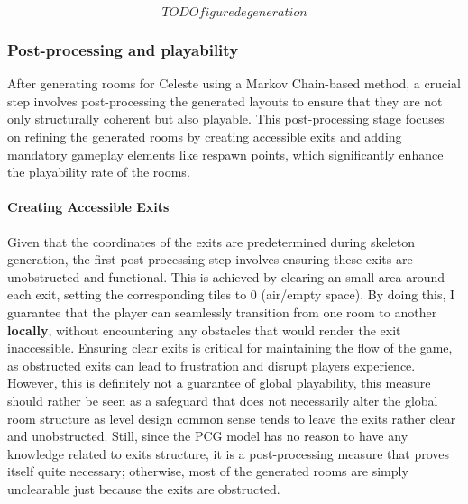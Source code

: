 \documentclass{article}
\begin{document}
$$TODO figure degeneration$$

\subsubsection{Post-processing and playability} \label{mod:play}
After generating rooms for Celeste using a Markov Chain-based method, a crucial step involves post-processing the generated layouts to ensure that they are not only structurally coherent but also playable. This post-processing stage focuses on refining the generated rooms by creating accessible exits and adding mandatory gameplay elements like respawn points, which significantly enhance the playability rate of the rooms.

\paragraph{Creating Accessible Exits} Given that the coordinates of the exits are predetermined during skeleton generation, the first post-processing step involves ensuring these exits are unobstructed and functional. This is achieved by clearing an small area around each exit, setting the corresponding tiles to $0$ (air/empty space). By doing this, I guarantee that the player can seamlessly transition from one room to another \textbf{locally}, without encountering any obstacles that would render the exit inaccessible. Ensuring clear exits is critical for maintaining the flow of the game, as obstructed exits can lead to frustration and disrupt players experience. However, this is definitely not a guarantee of global playability, this measure should rather be seen as a safeguard that does not necessarily alter the global room structure as level design common sense tends to leave the exits rather clear and unobstructed. Still, since the PCG model has no reason to have any knowledge related to exits structure, it is a post-processing measure that proves itself quite necessary; otherwise, most of the generated rooms are simply unclearable just because the exits are obstructed.
\end{document}
